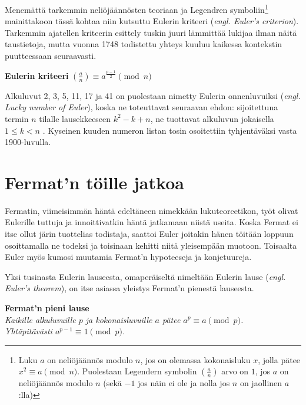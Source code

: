 \documentclass[a4paper,11pt]{article}
\begin{document}
Menemättä tarkemmin neliöjäännösten teoriaan ja Legendren symboliin\footnote{Luku $a$ on neliöjäännös modulo $n$, jos on olemassa kokonaisluku $x$, jolla pätee $x^2\equiv a \pmod n$. Puolestaan Legendern symbolin $\left(\frac{a}{n}\right)$ arvo on $1$, jos $a$ on neliöjäännös modulo $n$ (sekä $-1$ jos näin ei ole ja nolla jos $n$ on jaollinen $a$:lla)} mainittakoon tässä kohtaa niin kutsuttu Eulerin kriteeri (\textit{engl. Euler's criterion}). Tarkemmin ajatellen kriteerin esittely tuskin juuri lämmittää lukijaa ilman näitä taustietoja, mutta vuonna 1748 todistettu yhteys kuuluu kaikessa kontekstin puutteessaan seuraavasti.

\begin{center}
    \textbf{Eulerin kriteeri} $\left(\frac{a}{n}\right) \equiv a^{\frac{p-1}{2}} \pmod n$
\end{center}

Alkuluvut 2, 3, 5, 11, 17 ja 41 on puolestaan nimetty Eulerin onnenluvuiksi (\textit{engl. Lucky number of Euler}), koska ne toteuttavat seuraavan ehdon: sijoitettuna termin $n$ tilalle lausekkeeseen $k^2-k+n$, ne tuottavat alkuluvun jokaisella $1\leq k<n$ \cite{onnenluku}. Kyseinen kuuden numeron listan tosin osoitettiin tyhjentäväksi vasta 1900-luvulla.

\section{Fermat'n töille jatkoa}
\label{vitoi}

Fermatin, viimeisimmän häntä edeltäneen nimekkään lukuteoreetikon, työt olivat Eulerille tuttuja ja innoittivatkin häntä jatkamaan niistä useita. Koska Fermat ei itse ollut järin tuottelias todistaja, saattoi Euler joitakin hänen töitään loppuun osoittamalla ne todeksi ja toisinaan kehitti niitä yleisempään muotoon. Toisaalta Euler myös kumosi muutamia Fermat'n hypoteeseja ja konjetuureja.

Yksi tusinasta Eulerin lauseesta, omaperäiseltä nimeltään Eulerin lause (\textit{engl. Euler's theorem}), on itse asiassa yleistys Fermat'n pienestä lauseesta.

\begin{center}
    \textbf{Fermat'n pieni lause}\\
    \textit{Kaikille alkuluvuille $p$ ja kokonaisluvuille $a$ pätee $a^p\equiv a \pmod{p}$.\\
    Yhtäpitävästi $a^{p-1}\equiv 1 \pmod{p}$.}
\end{center}
\end{document}
